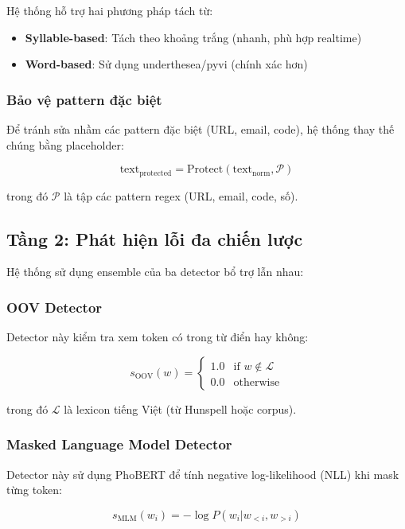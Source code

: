 \documentclass[conference]{IEEEtran}
\begin{document}
Hệ thống hỗ trợ hai phương pháp tách từ:
\begin{itemize}
    \item \textbf{Syllable-based}: Tách theo khoảng trắng (nhanh, phù hợp realtime)
    \item \textbf{Word-based}: Sử dụng underthesea/pyvi (chính xác hơn)
\end{itemize}

\subsubsection{Bảo vệ pattern đặc biệt}
Để tránh sửa nhầm các pattern đặc biệt (URL, email, code), hệ thống thay thế chúng bằng placeholder:

\begin{equation}
\text{text}_{\text{protected}} = \text{Protect}(\text{text}_{\text{norm}}, \mathcal{P})
\end{equation}

trong đó $\mathcal{P}$ là tập các pattern regex (URL, email, code, số).

\subsection{Tầng 2: Phát hiện lỗi đa chiến lược}

Hệ thống sử dụng ensemble của ba detector bổ trợ lẫn nhau:

\subsubsection{OOV Detector}
Detector này kiểm tra xem token có trong từ điển hay không:

\begin{equation}
s_{\text{OOV}}(w) = \begin{cases}
1.0 & \text{if } w \notin \mathcal{L} \\
0.0 & \text{otherwise}
\end{cases}
\end{equation}

trong đó $\mathcal{L}$ là lexicon tiếng Việt (từ Hunspell hoặc corpus).

\subsubsection{Masked Language Model Detector}
Detector này sử dụng PhoBERT để tính negative log-likelihood (NLL) khi mask từng token:

\begin{equation}
s_{\text{MLM}}(w_i) = -\log P(w_i | w_{<i}, w_{>i})
\end{equation}
\end{document}
